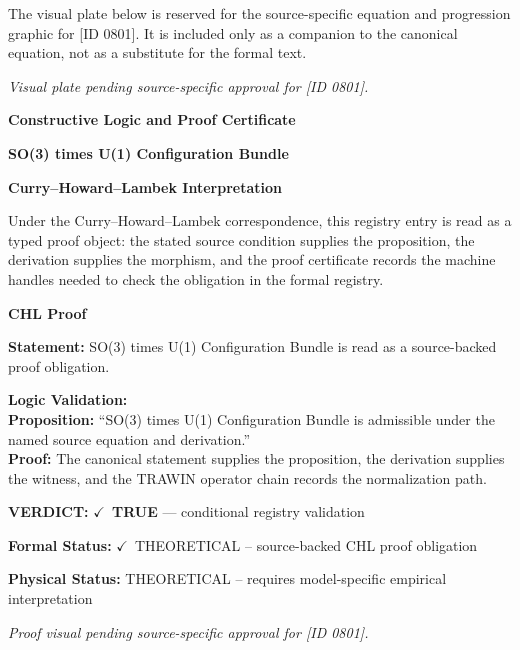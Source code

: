 \begingroup\footnotesize\sloppy
The visual plate below is reserved for the source-specific equation and progression graphic for [ID 0801]. It is included only as a companion to the canonical equation, not as a substitute for the formal text.
\par\endgroup
\begingroup\footnotesize\itshape
Visual plate pending source-specific approval for [ID 0801].
\par\endgroup

\clearpage
\begingroup\tzpsupportsetup
\noindent\textbf{\fontsize{10.8pt}{12.8pt}\selectfont [ID 0801] Constructive Logic and Proof Certificate}\par
\noindent\textbf{\fontsize{10pt}{12pt}\selectfont SO(3) times U(1) Configuration Bundle}\par
\vspace{0.45em}
\begingroup
\footnotesize
\setlength{\parskip}{0.22em}
\setlength{\parindent}{0pt}
\noindent\textbf{Curry--Howard--Lambek Interpretation}\par
Under the Curry--Howard--Lambek correspondence, this registry entry is read as a typed proof
object: the stated source condition supplies the proposition, the derivation supplies the
morphism, and the proof certificate records the machine handles needed to check the obligation
in the formal registry.

\vspace{0.45em}
\noindent\textbf{CHL Proof}\par
\textbf{Statement:} SO(3) times U(1) Configuration Bundle is read as a source-backed proof obligation.

\textbf{Logic Validation:}\\
\textbf{Proposition:} ``SO(3) times U(1) Configuration Bundle is admissible under the named source equation and derivation.''\\
\textbf{Proof:} The canonical statement supplies the proposition, the derivation supplies the witness, and the TRAWIN operator chain records the normalization path.

\textbf{VERDICT:} \ensuremath{\checkmark}\ \textbf{TRUE} --- conditional registry validation

\textbf{Formal Status:} \ensuremath{\checkmark}\ THEORETICAL -- source-backed CHL proof obligation

\textbf{Physical Status:} THEORETICAL -- requires model-specific empirical interpretation
\par\vspace{0.45em}
\par
\vfill
\begingroup\footnotesize\itshape
Proof visual pending source-specific approval for [ID 0801].
\par\endgroup
\vfill
\endgroup
\endgroup
